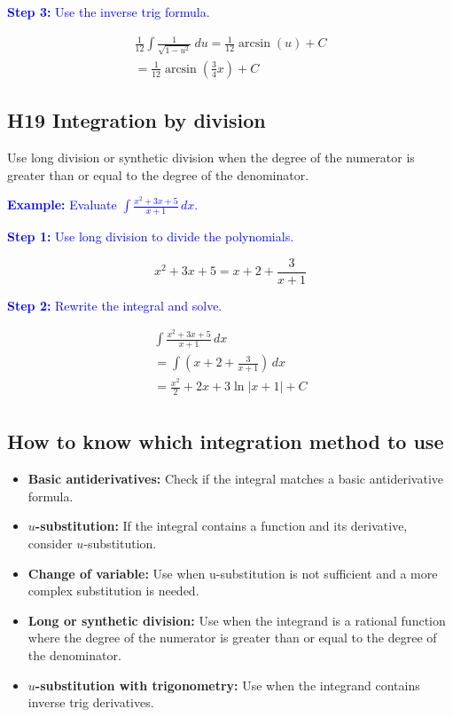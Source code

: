 \documentclass[letterpaper, 12pt]{article}
\newcommand{\example}[1]{\textcolor{blue}{\textbf{Example:} #1}}
\newcommand{\step}[2]{\textcolor{blue}{\textbf{Step #1:} #2}}
\begin{document}
\step{3}{Use the inverse trig formula.}

\begin{gather*}
\frac{1}{12} \int \frac{1}{\sqrt{1 - u^2}} \: du = \frac{1}{12} \arcsin(u) + C \\
= \boxed{\frac{1}{12} \arcsin\left(\frac{3}{4}x\right) + C}
\end{gather*}

\subsection*{H19 Integration by division}

Use long division or synthetic division when the degree of the numerator is greater than or equal to the degree of the denominator.

\example{Evaluate $\displaystyle \int \frac{x^2 + 3x + 5}{x + 1} \, dx$.}

\step{1}{Use long division to divide the polynomials.}

$$x^2 + 3x + 5 = x + 2 + \frac{3}{x + 1}$$

\step{2}{Rewrite the integral and solve.}

\begin{gather*}
\int \frac{x^2 + 3x + 5}{x + 1} \, dx \\
= \int (x + 2 + \frac{3}{x + 1}) \, dx \\
= \boxed{\frac{x^2}{2} + 2x + 3 \ln|x + 1| + C} \\
\end{gather*}

\subsection*{How to know which integration method to use}

\begin{itemize}
    \item \textbf{Basic antiderivatives:} Check if the integral matches a basic antiderivative formula.
    \item \textbf{$u$-substitution:} If the integral contains a function and its derivative, consider $u$-substitution.
    \item \textbf{Change of variable:} Use when u-substitution is not sufficient and a more complex substitution is needed.
    \item \textbf{Long or synthetic division:} Use when the integrand is a rational function where the degree of the numerator is greater than or equal to the degree of the denominator.
    \item \textbf{$u$-substitution with trigonometry:} Use when the integrand contains inverse trig derivatives.
\end{itemize}
    
\end{document}
